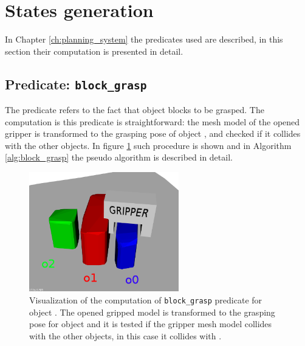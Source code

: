 \section{States generation}
In Chapter \ref{ch:planning_system}  the predicates used are described, in this section their computation is presented in detail. 

\subsection{Predicate: \texttt{block\_grasp}}
The  predicate refers to the fact that object  blocks  to be grasped. The computation is this predicate is straightforward: the mesh model of the opened gripper is transformed to the grasping pose of object , and checked if it collides with the other objects. In figure \ref{fig:block_grasp} such procedure is shown and in Algorithm \ref{alg:block_grasp} the pseudo algorithm is described in detail. 

\begin{figure}[tb]
\centering
\includegraphics[width=6.5cm]{Img/grasping/block_grasp.png}
\caption{Visualization of the computation of \texttt{block\_grasp} predicate for object . The opened gripped model is transformed to the grasping pose for object  and it is tested if the gripper mesh model collides with the other objects, in this case it collides with . }\label{fig:block_grasp}
\end{figure}

